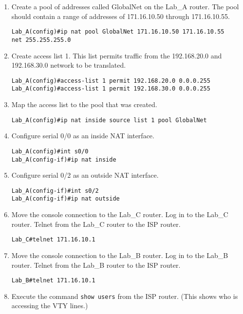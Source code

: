 \begin{enumerate}
\item
  Create a pool of addresses called GlobalNet on the Lab\_A router. The
  pool should contain a range of addresses of 171.16.10.50 through
  171.16.10.55.

\begin{verbatim}
Lab_A(config)#ip nat pool GlobalNet 171.16.10.50 171.16.10.55
net 255.255.255.0
\end{verbatim}
\item
  Create access list
  1. This list permits traffic from the 192.168.20.0 and 192.168.30.0
  network to be translated.

\begin{verbatim}
Lab_A(config)#access-list 1 permit 192.168.20.0 0.0.0.255
Lab_A(config)#access-list 1 permit 192.168.30.0 0.0.0.255
\end{verbatim}
\item
  Map the access list to the pool that was created.

\begin{verbatim}
Lab_A(config)#ip nat inside source list 1 pool GlobalNet
\end{verbatim}
\item
  Configure serial 0/0 as an inside NAT interface.

\begin{verbatim}
Lab_A(config)#int s0/0
Lab_A(config-if)#ip nat inside
\end{verbatim}
\item
  Configure serial 0/2 as an outside NAT interface.

\begin{verbatim}
Lab_A(config-if)#int s0/2
Lab_A(config-if)#ip nat outside
\end{verbatim}
\item
  Move the console connection to the Lab\_C router. Log in to the Lab\_C
  router. Telnet from the Lab\_C router to the ISP router.

\begin{verbatim}
Lab_C#telnet 171.16.10.1
\end{verbatim}
\item
  Move the console connection to the Lab\_B router. Log in to the Lab\_B
  router. Telnet from the Lab\_B router to the ISP router.

\begin{verbatim}
Lab_B#telnet 171.16.10.1
\end{verbatim}
\item
  Execute the command \texttt{show\ users} from the ISP router. (This
  shows who is accessing the VTY lines.)


\end{enumerate}
